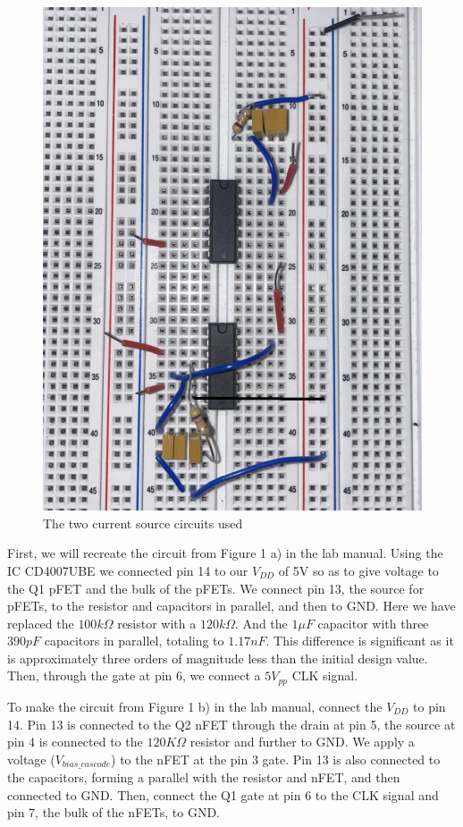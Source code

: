 \documentclass[onecolumn]{article}
\begin{document}
\begin{figure}[H]
    \centering
    \includegraphics[scale=0.5]{in3170lab3task1circuit.jpg}
    \caption{The two current source circuits used}
    \label{fig:enter-label}
\end{figure}

First, we will recreate the circuit from Figure 1 a) in the lab manual. Using the IC CD4007UBE we connected pin 14 to our $V_{DD}$ of 5V so as to give voltage to the Q1 pFET and the bulk of the pFETs. We connect pin 13, the source for pFETs, to the resistor and capacitors in parallel, and then to GND. Here we have replaced the $100k\Omega$ resistor with a $120k\Omega$. And the $1\mu F$ capacitor with three $390pF$ capacitors in parallel, totaling to $1.17nF$. This difference is significant as it is approximately three orders of magnitude less than the initial design value. Then, through the gate at pin 6, we connect a $5V_{pp}$ CLK signal.


To make the circuit from Figure 1 b) in the lab manual, connect the $V_{DD}$ to pin 14. Pin 13 is connected to the Q2 nFET through the drain at pin 5, the source at pin 4 is connected to the $120K\Omega$ resistor and further to GND. We apply a voltage ($V_{bias\_cascode}$) to the nFET at the pin 3 gate. Pin 13 is also connected to the capacitors, forming a parallel with the resistor and nFET, and then connected to GND. Then, connect the Q1 gate at pin 6 to the CLK signal and pin 7, the bulk of the nFETs, to GND.
\end{document}
